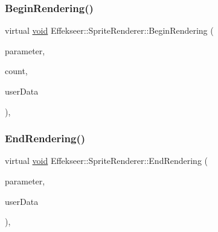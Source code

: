 \subsubsection{\texorpdfstring{Begin\+Rendering()}{BeginRendering()}}
{\footnotesize\ttfamily virtual \mbox{\hyperlink{namespace_effekseer_ab34c4088e512200cf4c2716f168deb56}{void}} Effekseer\+::\+Sprite\+Renderer\+::\+Begin\+Rendering (\begin{DoxyParamCaption}\item[{const \mbox{\hyperlink{struct_effekseer_1_1_sprite_renderer_1_1_node_parameter}{Node\+Parameter}} \&}]{parameter,  }\item[{int32\+\_\+t}]{count,  }\item[{\mbox{\hyperlink{namespace_effekseer_ab34c4088e512200cf4c2716f168deb56}{void}} $\ast$}]{user\+Data }\end{DoxyParamCaption})\hspace{0.3cm}{\ttfamily [inline]}, {\ttfamily [virtual]}}

\mbox{\label{class_effekseer_1_1_sprite_renderer_a077dde1bafb304138dc929f607e8fb49}} 
\subsubsection{\texorpdfstring{End\+Rendering()}{EndRendering()}}
{\footnotesize\ttfamily virtual \mbox{\hyperlink{namespace_effekseer_ab34c4088e512200cf4c2716f168deb56}{void}} Effekseer\+::\+Sprite\+Renderer\+::\+End\+Rendering (\begin{DoxyParamCaption}\item[{const \mbox{\hyperlink{struct_effekseer_1_1_sprite_renderer_1_1_node_parameter}{Node\+Parameter}} \&}]{parameter,  }\item[{\mbox{\hyperlink{namespace_effekseer_ab34c4088e512200cf4c2716f168deb56}{void}} $\ast$}]{user\+Data }\end{DoxyParamCaption})\hspace{0.3cm}{\ttfamily [inline]}, {\ttfamily [virtual]}}

\mbox{\label{class_effekseer_1_1_sprite_renderer_a8e3f9a32bb103082e32a754fd689bbef}} 

